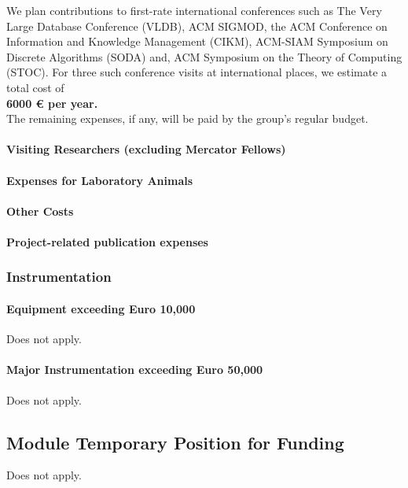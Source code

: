 		We plan contributions to first-rate international conferences such as The Very Large Database Conference (VLDB), ACM SIGMOD, 
		the ACM Conference on Information and Knowledge Management (CIKM), ACM-SIAM Symposium on Discrete Algorithms (SODA) and, ACM Symposium on the Theory of Computing (STOC). For three such conference visits at international places, we estimate a total cost of \\

		{\bf	6000 \euro\xspace per year.} \\

		\noindent The remaining expenses, if any, will be paid by the group's regular budget.

		\paragraph{Visiting Researchers (excluding Mercator Fellows)}

		\paragraph{Expenses for Laboratory Animals}

		\paragraph{Other Costs}

		\paragraph{Project-related publication expenses}

	\subsubsection{Instrumentation}
		\paragraph{Equipment exceeding Euro 10,000}$\,$\medskip\\
Does not apply.
		\paragraph{Major Instrumentation exceeding Euro 50,000}$\,$\medskip\\
Does not apply.
\subsection{Module Temporary Position for Funding}
Does not apply.
